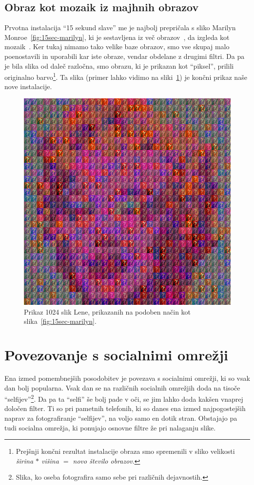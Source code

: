 \documentclass[a4paper, 12pt]{book}
\begin{document}
\section{Obraz kot mozaik iz majhnih obrazov}
Prvotna instalacija ``15 sekund slave'' me je najbolj prepričala s sliko
Marilyn Monroe~\ref{fig:15sec-marilyn}, ki je sestavljena iz več
obrazov~\cite{katalog_solina}, da izgleda kot mozaik~\cite{thesisSasoStulac}.
Ker tukaj nimamo tako velike baze obrazov, smo vse skupaj malo poenostavili in
uporabili kar iste obraze, vendar obdelane z drugimi filtri. Da pa je bila
slika od daleč razločna, smo obrazu, ki je prikazan kot ``piksel'', prilili
originalno barvo\footnote{Prejšnji končni rezultat instalacije obraza smo
spremenili v sliko velikosti \textit{širina $*$ višina $=$ novo število
obrazov}.}. Ta slika (primer lahko vidimo na sliki~\ref{fig:FoF-marilyn}) je
končni prikaz naše nove instalacije.

\begin{figure}[!ht]
    \centering
    \includegraphics[width=\textwidth]{FoF-marilyn}
    \caption{Prikaz 1024 slik Lene, prikazanih na podoben način kot slika~\ref{fig:15sec-marilyn}.}
    \label{fig:FoF-marilyn}
\end{figure}


\chapter{Povezovanje s socialnimi omrežji}
\label{ch:socialNetwork}
Ena izmed pomembnejših posodobitev je povezava s socialnimi omrežji, ki so
vsak dan bolj popularna. Vsak dan se na različnih socialnih omrežjih doda na
tisoče ``selfijev''\footnote{Slika, ko oseba fotografira
samo sebe pri različnih dejavnostih.}. Da pa ta ``selfi'' še bolj pade v
oči, se jim lahko doda kakšen vnaprej določen filter. Ti so pri pametnih
telefonih, ki so danes ena izmed najpogostejših naprav za fotografiranje
``selfijev'', na voljo samo en dotik stran. Obstajajo pa tudi socialna
omrežja, ki ponujajo osnovne filtre že pri nalaganju slike.
\end{document}
